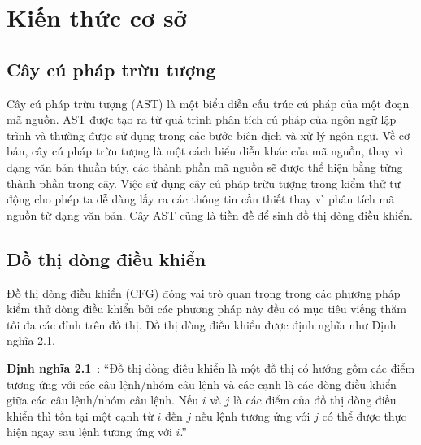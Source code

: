 \chapter{Kiến thức cơ sở}\label{chap2}

\section{Cây cú pháp trừu tượng} \label{sec:kno-ast}
Cây cú pháp trừu tượng (AST) là một biểu diễn cấu trúc cú pháp của một đoạn mã nguồn. AST được tạo ra từ quá trình phân tích cú pháp của ngôn ngữ lập trình và thường được sử dụng trong các bước biên dịch và xử lý ngôn ngữ. Về cơ bản, cây cú pháp trừu tượng là một cách biểu diễn khác của mã nguồn, thay vì dạng văn bản thuần túy, các thành phần mã nguồn sẽ được thể hiện bằng từng thành phần trong cây. Việc sử dụng cây cú pháp trừu tượng trong kiểm thử tự động cho phép ta dễ dàng lấy ra các thông tin cần thiết thay vì phân tích mã nguồn từ dạng văn bản. Cây AST cũng là tiền đề để sinh đồ thị dòng điều khiển.
	
\section{Đồ thị dòng điều khiển} \label{sec:cfg}
Đồ thị dòng điều khiển (CFG) đóng vai trò quan trọng trong các phương pháp kiểm thử dòng điều khiển bởi các phương pháp này đều có mục tiêu viếng thăm tối đa các đỉnh trên đồ thị. Đồ thị dòng điều khiển được định nghĩa như Định nghĩa 2.1.

\textbf{Định nghĩa 2.1}~\cite{GiaoTrinhKiemThu}: ``Đồ thị dòng điều khiển là một đồ thị có hướng gồm các điểm tương ứng với các câu lệnh/nhóm câu lệnh và các cạnh là các dòng điều khiển giữa các câu lệnh/nhóm câu lệnh. Nếu $i$ và $j$ là các điểm của đồ thị dòng điều khiển thì tồn tại một cạnh từ $i$ đến $j$ nếu lệnh tương ứng với $j$ có thể được thực hiện ngay sau lệnh tương ứng với $i$.''

